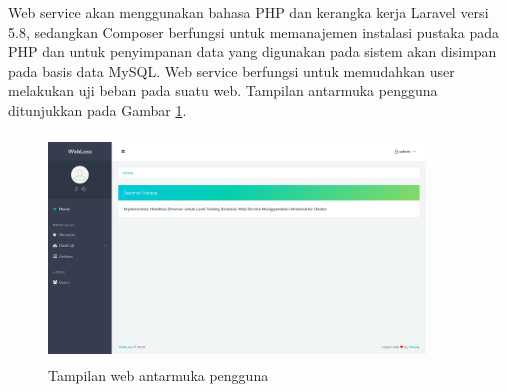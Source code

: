 			\indent Web service akan menggunakan bahasa PHP dan kerangka kerja Laravel versi 5.8, sedangkan Composer berfungsi untuk memanajemen instalasi pustaka pada PHP dan untuk penyimpanan data yang digunakan pada sistem akan disimpan pada basis data MySQL. Web service berfungsi untuk memudahkan user melakukan uji beban pada suatu web. Tampilan antarmuka pengguna ditunjukkan pada Gambar \ref{gambarweb}.
			
			\begin{figure}[H]
				\centering
				\includegraphics[width=10cm,height=6cm]{Images/C-4/gambarweb.png}
				\caption{Tampilan web antarmuka pengguna}
				\label{gambarweb}
			\end{figure}
			
